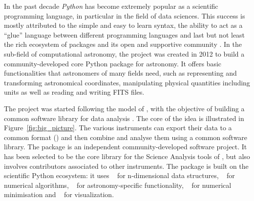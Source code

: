 \documentclass[longauth]{aa}
\begin{document}
In the past decade \textit{Python} has become extremely popular as a scientific programming language,
in particular in the field of data sciences. This success is
mostly attributed to the simple and easy to learn syntax, the ability to act as
a \enquote{glue} language between different programming languages and last but not least
the rich ecosystem of packages and its open and supportive community \citep{Momcheva2015}.
In the sub-field of computational astronomy, the \astropy project \citep{astropy} was created in 2012
to build a community-developed core Python package for astronomy.
It offers basic functionalities that astronomers of many fields need, such as representing
and transforming astronomical coordinates, manipulating physical quantities including units
as well as reading and writing FITS files.


The \gammapy project was started following the model of \astropy, with the objective of building a common
software library for \gammaray data analysis \citep{gammapy_2015}. 
The core of the idea is illustrated in Figure~\ref{fig:big_picture}. The various \gammaray instruments
can export their data to a common format (\gadf) and then combine and analyse
them using a common software library.
The \gammapy package is an independent community-developed software project.
It has been selected to be the core library for the Science Analysis tools of \cta,
but also involves contributors associated to other instruments.
The \gammapy package is built on the scientific Python ecosystem: it uses \numpy~\citep{numpy} for n-dimensional data
structures, \scipy~\citep{2020SciPy-NMeth} for numerical algorithms, \astropy~\citep{astropy} for
astronomy-specific functionality, \iminuit~\citep{iminuit} for numerical minimisation
and \matplotlib~\citep{matplotlib} for visualization.

\end{document}
